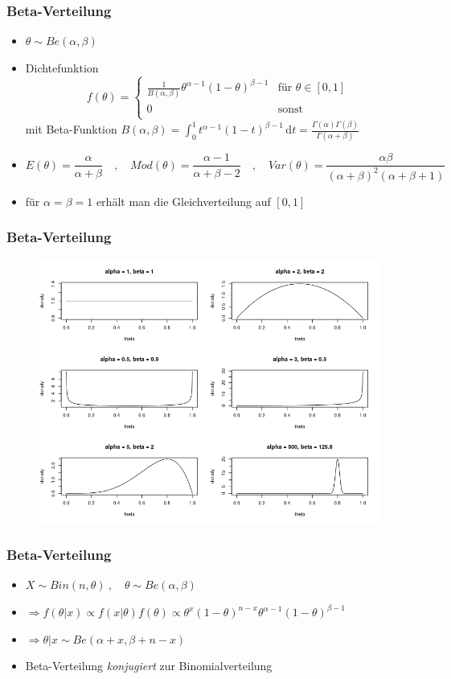 \documentclass[aspectratio=169,xcolor=dvipsnames]{beamer}
\begin{document}
\begin{frame}
\frametitle{Beta-Verteilung}
\begin{itemize}
\item<1-> $\theta \sim Be(\alpha,\beta)$
\item<2-> Dichtefunktion $$f(\theta)=\left\{\begin{array}{ll}
\frac{1}{B(\alpha,\beta)}\theta^{\alpha -1}(1-\theta)^{\beta -1} & \text{für }\theta\in[0,1]\\
0 & \text{sonst}\\
\end{array}\right.$$
mit Beta-Funktion $B(\alpha,\beta)=\int_0^1t^{\alpha-1}(1-t)^{\beta-1}\,\text{d}t = \frac{\Gamma(\alpha)\Gamma(\beta)}{\Gamma(\alpha+\beta)}$
\item<3-> $$E(\theta) = \frac{\alpha}{\alpha+\beta}\quad,\quad Mod(\theta)=\frac{\alpha-1}{\alpha+\beta-2}\quad,\quad Var(\theta)=\frac{\alpha\beta}{(\alpha+\beta)^2(\alpha+\beta+1)}$$
\item<4-> für $\alpha=\beta=1$ erhält man die Gleichverteilung auf $[0,1]$
\end{itemize}
\end{frame}

\begin{frame}
\frametitle{Beta-Verteilung}
\begin{figure}
\includegraphics[height=0.85\textheight]{betaDistribution}
\end{figure}
\end{frame}

\begin{frame}
\frametitle{Beta-Verteilung}
\begin{itemize}
\item<1-> $X\sim Bin(n,\theta)~,\quad \theta\sim Be(\alpha,\beta)$
\item<2-> $\Rightarrow f(\theta|x)\propto f(x|\theta)f(\theta)\propto \theta^x(1-\theta)^{n-x}\theta^{\alpha-1}(1-\theta)^{\beta-1}$
\item<3-> $\Rightarrow \theta|x \sim Be(\alpha+x,\beta+n-x)$
\item<4-> Beta-Verteilung \textit{konjugiert} zur Binomialverteilung
\end{itemize}
\end{frame}
\end{document}
